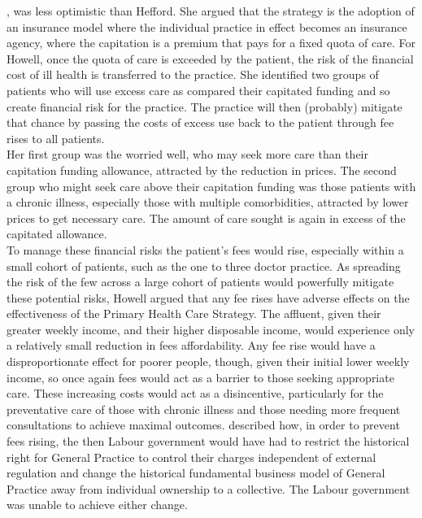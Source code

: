 \documentclass[11pt,a4paper]{article}
\begin{document}
\citet{howell2005restructuring}, was less optimistic than Hefford. She argued that the strategy is the adoption of an insurance model where the individual practice in effect becomes an insurance agency, where the capitation is a premium that pays for a fixed quota of care. For Howell, once the quota of care is exceeded by the patient, the risk of the financial cost of ill health is transferred to the practice. She identified two groups of patients who will use excess care as compared their capitated funding and so create financial risk for the practice. The practice will then (probably) mitigate that chance by passing the costs of excess use back to the patient through fee rises to all patients.\\


Her first group was the worried well, who may seek more care than their capitation funding allowance, attracted by the reduction in prices. The second group who might seek care above their capitation funding was those patients with a chronic illness, especially those with multiple comorbidities, attracted by lower prices to get necessary care. The amount of care sought is again in excess of the capitated allowance.\\  


To manage these financial risks the patient's fees would rise, especially within a small cohort of patients, such as the one to three doctor practice. As spreading the risk of the few across a large cohort of patients would powerfully mitigate these potential risks, Howell argued that any fee rises have adverse effects on the effectiveness of the Primary Health Care Strategy. The affluent, given their greater weekly income, and their higher disposable income,  would experience only a relatively small reduction in fees affordability. Any fee rise would have a disproportionate effect for poorer people, though, given their initial lower weekly income, so once again fees would act as a barrier to those seeking appropriate care. These increasing costs would act as a disincentive, particularly for the preventative care of those with chronic illness and those needing more frequent consultations to achieve maximal outcomes.  \citet{howell2005restructuring} described how, in order to prevent fees rising, the then Labour government would have had to restrict the historical right for General Practice to control their charges independent of external regulation and change the historical fundamental business model of General Practice away from individual ownership to a collective.  The Labour government was unable to achieve either change.\\
\end{document}
